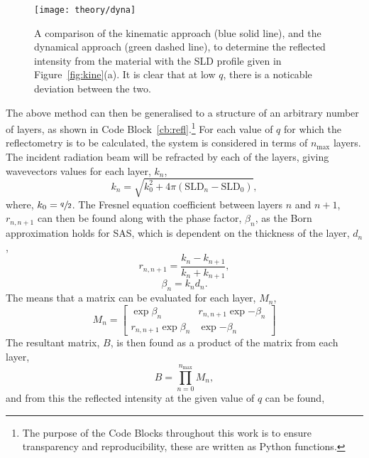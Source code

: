 %
\begin{figure}[t]
    \forceversofloat
    \centering
    \texttt{[image: theory/dyna]}
    \caption{A comparison of the kinematic approach (blue solid line), and the dynamical approach (green dashed line), to determine the reflected intensity from the material with the SLD profile given in Figure~\protect\ref{fig:kine}(a). It is clear that at low $q$, there is a noticable deviation between the two.}
    \label{fig:dyna}
\end{figure}
%
The above method can then be generalised to a structure of an arbitrary number of layers, as shown in Code Block~\ref{cb:refl}.\footnote{The purpose of the Code Blocks throughout this work is to ensure transparency and reproducibility, these are written as Python functions.}
For each value of $q$ for which the reflectometry is to be calculated, the system is considered in terms of $n_{\text{max}}$ layers.
The incident radiation beam will be refracted by each of the layers, giving wavevectors values for each layer, $k_n$,
%
\begin{equation}
    \label{equ:knsld}
    k_n = \sqrt{k_0^2 + 4\pi (\text{SLD}_n - \text{SLD}_0)},
\end{equation}
%
where, $k_0=\sfrac{q}{2}$.
The Fresnel equation coefficient between layers $n$ and $n+1$, $r_{n,n+1}$ can then be found along with the phase factor, $\beta_n$, as the Born approximation holds for SAS, which is dependent on the thickness of the layer, $d_n$,
%
\begin{equation}
    r_{n,n+1} = \frac{k_n - k_{n+1}}{k_n + k_{n+1}},
    \label{equ:fres}
\end{equation}
%
%
\begin{equation}
    \label{equ:nowthick}
    \beta_n = k_n d_n.
\end{equation}
%
The means that a matrix can be evaluated for each layer, $M_n$,
%
\begin{equation}
    M_n =
    \begin{bmatrix}
        \exp{\beta_n} & r_{n,n+1}\exp{-\beta_n} \\ r_{n,n+1}\exp{\beta_n} & \exp{-\beta_n}
    \end{bmatrix}
\end{equation}
%
The resultant matrix, $B$, is then found as a product of the matrix from each layer,
%
\begin{equation}
    B = \prod_{n=0}^{n_{\text{max}}} M_n,
\end{equation}
%
and from this the reflected intensity at the given value of $q$ can be found,
